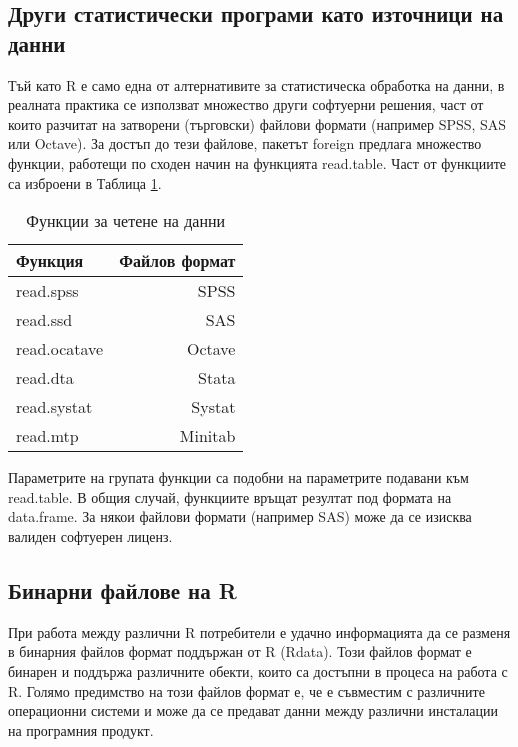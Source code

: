 \subsection{Други статистически програми като източници на данни}

Тъй като R е само една от алтернативите за статистическа обработка на данни, в реалната практика се използват множество други софтуерни решения, част от които разчитат на затворени (търговски) файлови формати (например SPSS, SAS или Octave). За достъп до тези файлове, пакетът foreign предлага множество функции, работещи по сходен начин на функцията read.table. Част от функциите са изброени в Таблица \ref{table0001}.

\begin{table}[h!]
\centering
\begin{tabular}{|l|r|} 
  \rowcolor{lightgray}
  \hline
  Функция & Файлов формат \\ [0.1ex] 
  \hline\hline
  read.spss & SPSS \\
  \hline
  read.ssd & SAS \\
  \hline
  read.ocatave & Octave \\
  \hline
  read.dta & Stata \\
  \hline
  read.systat & Systat \\
  \hline
  read.mtp & Minitab \\
  \hline
\end{tabular}
\caption{Функции за четене на данни}
\label{table0001}
\end{table}

Параметрите на групата функции са подобни на параметрите подавани към read.table. В общия случай, функциите връщат резултат под формата на data.frame. За някои файлови формати (например SAS) може да се изисква валиден софтуерен лиценз.

\subsection{Бинарни файлове на R}

При работа между различни R потребители е удачно информацията да се разменя в бинарния файлов формат поддържан от R (Rdata). Този файлов формат е бинарен и поддържа различните обекти, които са достъпни в процеса на работа с R. Голямо предимство на този файлов формат е, че е съвместим с различните операционни системи и може да се предават данни между различни инсталации на програмния продукт.

